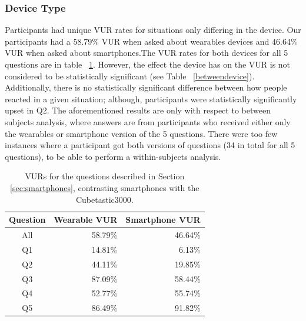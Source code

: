 \documentclass{acm_proc_article-sp}
\begin{document}

\subsubsection{Device Type}
Participants had unique VUR rates for situations only differing in the device. Our participants had a 58.79\% VUR when asked about wearables devices and 46.64\% VUR when asked about smartphones.The VUR rates for both devices for all 5 questions are in table ~\ref{deviceVUR}. However, the effect the device has on the VUR is not considered to be statistically significant (see Table ~\ref{betweendevice}). Additionally, there is no statistically significant difference between how people reacted in a given situation; although, participants were statistically significantly upset in Q2.  The aforementioned results are only with respect to between subjects analysis, where answers are from participants who received either only the wearables or smartphone version of the 5 questions. There were too few instances where a participant got both versions of questions (34 in total for all 5 questions), to be able to perform a within-subjects analysis. 

\begin{table}[t]
\begin{center}
\begin{tabular}{| c | r | r |}
\hline
 Question &  Wearable VUR & Smartphone VUR \\
 \hline
 All & 58.79\% & 46.64\%\\
Q1 & 14.81\%  &  6.13\%\\
Q2 & 44.11\%  &  19.85\%\\
Q3 & 87.09\%  &  58.44\%\\
Q4 & 52.77\%  & 55.74\%\\
Q5 & 86.49\%  &  91.82\%\\ 
\hline
\end{tabular}
\caption{VURs for the questions described in Section \ref{sec:smartphones}, contrasting smartphones with the Cubetastic3000.}
\label{deviceVUR}
\end{center}
\end{table}
\end{document}
